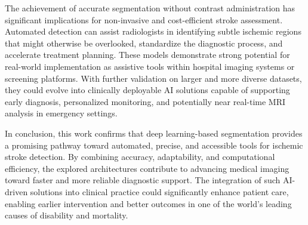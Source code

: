 \documentclass[12pt]{article}
\begin{document}
%
The achievement of accurate segmentation without contrast administration has significant implications for non-invasive and cost-efficient stroke assessment. Automated detection can assist radiologists in identifying subtle ischemic regions that might otherwise be overlooked, standardize the diagnostic process, and accelerate treatment planning. These models demonstrate strong potential for real-world implementation as assistive tools within hospital imaging systems or screening platforms. With further validation on larger and more diverse datasets, they could evolve into clinically deployable AI solutions capable of supporting early diagnosis, personalized monitoring, and potentially near real-time MRI analysis in emergency settings.

In conclusion, this work confirms that deep learning-based segmentation provides a promising pathway toward automated, precise, and accessible tools for ischemic stroke detection. By combining accuracy, adaptability, and computational efficiency, the explored architectures contribute to advancing medical imaging toward faster and more reliable diagnostic support. The integration of such AI-driven solutions into clinical practice could significantly enhance patient care, enabling earlier intervention and better outcomes in one of the world’s leading causes of disability and mortality.

\printbibliography[heading=bibintoc,title={References}]
\end{document}
